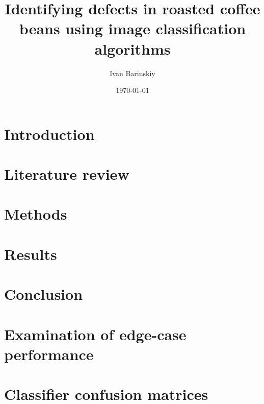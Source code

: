 \documentclass{./template/UoYCSproject}
\author{Ivan Barinskiy}
\date{\today}
\title{Identifying defects in roasted coffee beans using image classification algorithms}
\begin{document}
	\maketitle

	\listoffigures

	\listoftables

	\begin{summary}
		
	\end{summary}

	\chapter{Introduction}
	\label{ch:introduction}
	

	\chapter{Literature review}
	\label{ch:litreview}
	

	\chapter{Methods}
	\label{ch:methods}
	

	\chapter{Results}
	\label{ch:results}
    

	\chapter{Conclusion}
	\label{ch:conclusion}
	

	\appendix
	\chapter{Examination of edge-case performance}
	\label{ch:appendix1}
	

	\chapter{Classifier confusion matrices}
	\label{ch:appendix2}
	

	\printbibliography
\end{document}

